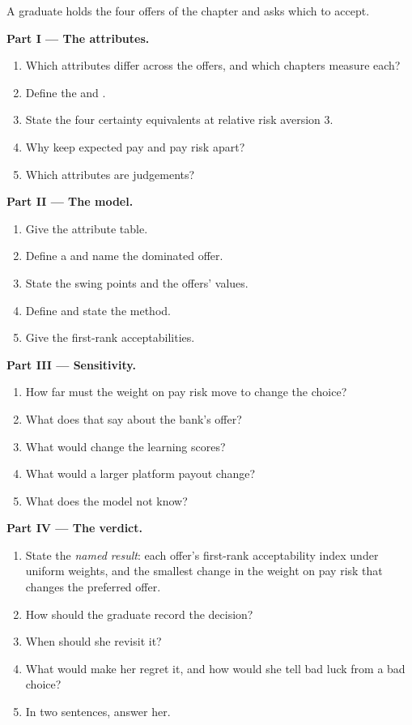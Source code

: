\begin{problem}\label{pb:in:choosing:1}
A graduate holds the four offers of the chapter and asks which to accept.

\medskip\noindent\textbf{Part I --- The attributes.}
\begin{enumerate}
\item Which attributes differ across the offers, and which chapters measure each?
\item Define the  and .
\item State the four certainty equivalents at relative risk aversion 3.
\item Why keep expected pay and pay risk apart?
\item Which attributes are judgements?
\end{enumerate}

\medskip\noindent\textbf{Part II --- The model.}
\begin{enumerate}[resume]
\item Give the attribute table.
\item Define a  and name the dominated offer.
\item State the swing points and the offers' values.
\item Define  and state the method.
\item Give the first-rank acceptabilities.
\end{enumerate}

\medskip\noindent\textbf{Part III --- Sensitivity.}
\begin{enumerate}[resume]
\item How far must the weight on pay risk move to change the choice?
\item What does that say about the bank's offer?
\item What would change the learning scores?
\item What would a larger platform payout change?
\item What does the model not know?
\end{enumerate}

\medskip\noindent\textbf{Part IV --- The verdict.}
\begin{enumerate}[resume]
\item State the \emph{named result}: each offer's first-rank acceptability index under uniform weights, and the smallest
change in the weight on pay risk that changes the preferred offer.
\item How should the graduate record the decision?
\item When should she revisit it?
\item What would make her regret it, and how would she tell bad luck from a bad choice?
\item In two sentences, answer her.
\end{enumerate}
\end{problem}

